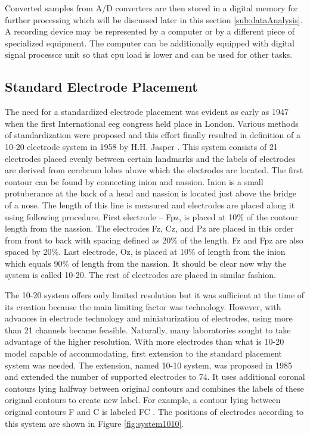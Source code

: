 Converted samples from A/D converters are then stored in a digital memory for further
processing which will be discussed later in this section \ref{sub:dataAnalysis}.
A recording device may be represented by a computer or by a
different piece of specialized equipment. The computer can be additionally
equipped with digital signal processor unit so that \gls{cpu} load is lower and can be
used for other tasks.

\subsection{Standard Electrode Placement}
\label{ssec:elPlacement}
The need for a standardized electrode placement was evident as early as 1947 when
the first International \gls{eeg} congress held place in London. Various methods of
standardization were proposed and this effort finally resulted in definition
of a 10-20 electrode system in 1958 by H.H. Jasper \cite{placeSys}. 
This system consists of 21 electrodes placed evenly between certain landmarks
and the labels of electrodes are derived from cerebrum lobes above which the electrodes
are located. The first contour can be found by connecting inion and nassion.
Inion is a small protuberance at the back of a head and nassion is located just
above the bridge of a nose. The length of this line is measured and electrodes are
placed along it using following procedure. First electrode -- Fpz, is placed at
10\% of the contour length from the nassion. The electrodes Fz, Cz, and Pz are placed in this
order from front to back with spacing defined as 20\% of the length. Fz and Fpz are also
spaced by 20\%. Last electrode, Oz, is placed at 10\% of length from the inion
which equals 90\% of length from the nassion. It should be clear now why the system
is called 10-20. The rest of electrodes are placed in similar fashion.

The 10-20 system offers only limited resolution but it was sufficient at the
time of its creation because the main limiting factor was technology. However,
with advances in electrode technology and miniaturization of electrodes, using more than
21 channels became feasible. Naturally, many laboratories sought to take advantage of the
higher resolution. With more electrodes than what is 10-20 model capable of
accommodating, first extension to the standard placement system was needed. The
extension, named 10-10 system, was proposed in 1985 and extended the number of supported
electrodes to 74. It uses additional coronal contours lying halfway between
original contours and combines the labels of these original contours to create
new label. For example, a contour lying between original contours F and C is labeled FC \cite{placeSys}. The positions of electrodes according to this
system are shown in Figure \ref{fig:system1010}. 

